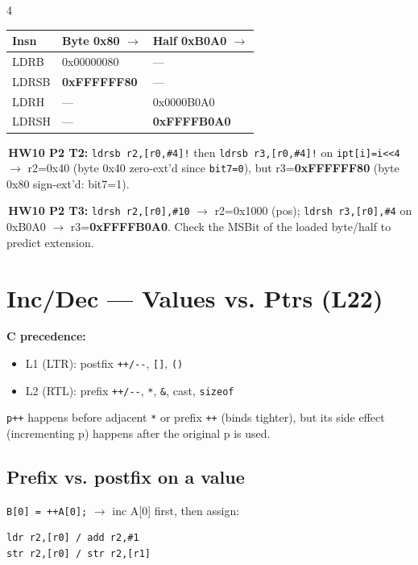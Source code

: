 \documentclass[8pt,landscape]{extarticle}
\newcommand{\asm}[1]{\texttt{\scriptsize #1}}
\newcommand{\cee}[1]{\texttt{\scriptsize #1}}
\newenvironment{ex}
  {\par\smallskip\noindent{\scriptsize\color{red!55!black}\textbf{Ex.}}\,\scriptsize\ignorespaces}
  {\par}
\begin{document}
\begin{multicols*}{4}
\begin{tabular}{@{}lll@{}}
\toprule
Insn & Byte 0x80 $\to$ & Half 0xB0A0 $\to$ \\
\midrule
LDRB  & 0x00000080          & --- \\
LDRSB & \textbf{0xFFFFFF80} & --- \\
LDRH  & ---                 & 0x0000B0A0 \\
LDRSH & ---                 & \textbf{0xFFFFB0A0} \\
\bottomrule
\end{tabular}

\begin{ex}\textbf{HW10 P2 T2:} \asm{ldrsb r2,[r0,\#4]!} then \asm{ldrsb r3,[r0,\#4]!} on \texttt{ipt[i]=i<<4} $\to$ r2=0x40 (byte 0x40 zero-ext'd since \texttt{bit7=0}), but r3=\textbf{0xFFFFFF80} (byte 0x80 sign-ext'd: bit7=1).\end{ex}

\begin{ex}\textbf{HW10 P2 T3:} \asm{ldrsh r2,[r0],\#10} $\to$ r2=0x1000 (pos); \asm{ldrsh r3,[r0],\#4} on 0xB0A0 $\to$ r3=\textbf{0xFFFFB0A0}. Check the MSBit of the loaded byte/half to predict extension.\end{ex}

\section{Inc/Dec --- Values vs. Ptrs (L22)}
\textbf{C precedence:}
\begin{itemize}
\item L1 (LTR): postfix \texttt{++/-{}-}, \texttt{[]}, \texttt{()}
\item L2 (RTL): prefix \texttt{++/-{}-}, \texttt{*}, \texttt{\&}, cast, \texttt{sizeof}
\end{itemize}

\cee{p++} happens before adjacent \texttt{*} or prefix \texttt{++} (binds tighter), but its side effect (incrementing p) happens after the original p is used.

\subsection{Prefix vs. postfix on a value}
\cee{B[0] = ++A[0];} $\to$ inc A[0] first, then assign:
\begin{lstlisting}
ldr r2,[r0] / add r2,#1
str r2,[r0] / str r2,[r1]
\end{lstlisting}


\end{multicols*}
\end{document}
